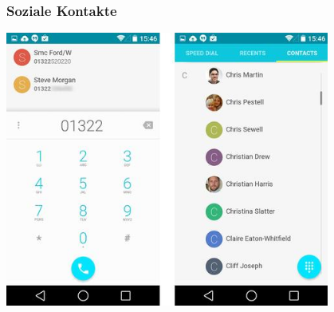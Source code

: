 \begin{frame}
	\frametitle{Soziale Kontakte}
	\begin{center}
		\includegraphics[width=0.8\textwidth]{img/phone-contacts.jpg}
	\end{center}
\end{frame}
